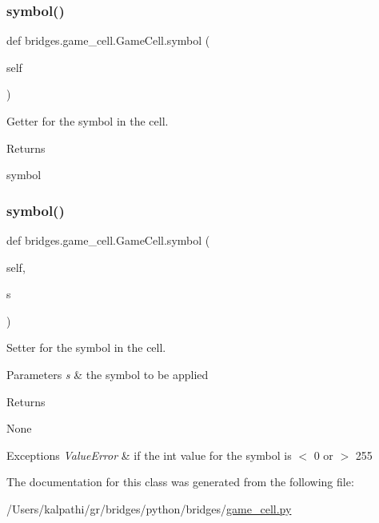 \subsubsection{\texorpdfstring{symbol()}{symbol()}\hspace{0.1cm}{\footnotesize\ttfamily [1/2]}}
{\footnotesize\ttfamily def bridges.\+game\+\_\+cell.\+Game\+Cell.\+symbol (\begin{DoxyParamCaption}\item[{}]{self }\end{DoxyParamCaption})}



Getter for the symbol in the cell. 

\begin{DoxyReturn}{Returns}


symbol 
\end{DoxyReturn}
\mbox{\label{classbridges_1_1game__cell_1_1_game_cell_a2ce9aa7d7d7835c511338c65a1457e22}} 
\subsubsection{\texorpdfstring{symbol()}{symbol()}\hspace{0.1cm}{\footnotesize\ttfamily [2/2]}}
{\footnotesize\ttfamily def bridges.\+game\+\_\+cell.\+Game\+Cell.\+symbol (\begin{DoxyParamCaption}\item[{}]{self,  }\item[{}]{s }\end{DoxyParamCaption})}



Setter for the symbol in the cell. 


\begin{DoxyParams}{Parameters}
{\em s} & the symbol to be applied \\
\hline
\end{DoxyParams}
\begin{DoxyReturn}{Returns}


None
\end{DoxyReturn}

\begin{DoxyExceptions}{Exceptions}
{\em Value\+Error} & if the int value for the symbol is $<$ 0 or $>$ 255 \\
\hline
\end{DoxyExceptions}


The documentation for this class was generated from the following file\+:\begin{DoxyCompactItemize}
\item 
/\+Users/kalpathi/gr/bridges/python/bridges/\mbox{\hyperlink{game__cell_8py}{game\+\_\+cell.\+py}}\end{DoxyCompactItemize}
